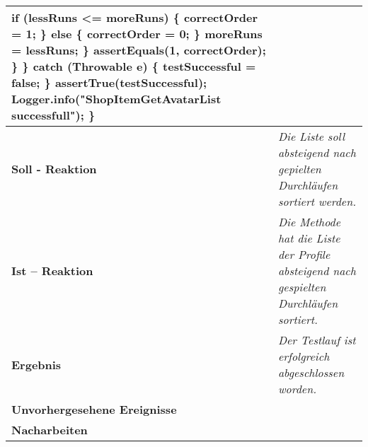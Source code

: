\begin{longtable}{|p{4cm}|p{11cm}|}
{\hspace*{12mm}                if (lessRuns <= moreRuns) \{ \newline
\hspace*{15mm}                    correctOrder = 1; \newline
\hspace*{12mm}                \} else \{ \newline
\hspace*{15mm}                    correctOrder = 0; \newline
\hspace*{12mm}                \} \newline
\hspace*{12mm}                moreRuns = lessRuns; \newline
\hspace*{9mm}            \} \newline
\hspace*{9mm}            assertEquals(1, correctOrder); \newline
\hspace*{6mm}        \} \newline
\hspace*{3mm}    \} catch (Throwable e) \{ \newline
\hspace*{6mm}        testSuccessful = false; \newline
\hspace*{3mm}    \} \newline
\hspace*{3mm}    assertTrue(testSuccessful); \newline
\hspace*{3mm}    Logger.info("ShopItemGetAvatarList successfull"); \newline
\} \newline
} \\
\hline
\textbf{Soll - Reaktion} & \textit{Die Liste soll absteigend nach gepielten Durchläufen sortiert werden.} \\
\hline
\textbf{Ist -- Reaktion} & \textit{Die Methode hat die Liste der Profile absteigend nach gespielten Durchläufen sortiert.} \\
\hline
\textbf{Ergebnis} & \textit{Der Testlauf ist erfolgreich abgeschlossen worden.} \\
\hline
\textbf{Unvorhergesehene Ereignisse} &
\textit{} \\
\hline
\textbf{Nacharbeiten } & \textit{} \\
\hline
\end{longtable}

